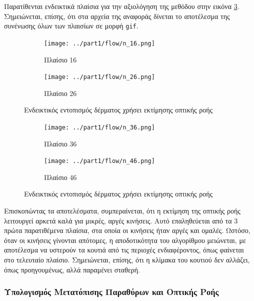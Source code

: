 \documentclass{article}
\newcommand{\eng}[1]{\foreignlanguage{english}{#1}}
\begin{document}
Παρατίθενται ενδεικτικά πλαίσια για την αξιολόγηση της μεθόδου στην εικόνα \ref{fig:tracking1}. Σημειώνεται, επίσης, ότι στα αρχεία της αναφοράς δίνεται το αποτέλεσμα της συνένωσης όλων των πλαισίων σε μορφή \texttt{\eng{gif}}.

\begin{figure}[h]
    \centering
    \begin{subfigure}[b]{0.49\textwidth}
        \centering{}
        \texttt{[image: ../part1/flow/n\_16.png]}
        \caption{Πλαίσιο 16}
        \label{fig:}
    \end{subfigure}
    \hfill
    \begin{subfigure}[b]{0.49\textwidth}  
        \centering 
        \texttt{[image: ../part1/flow/n\_26.png]}
        \caption{Πλαίσιο 26}
        \label{fig:}
    \end{subfigure}
    \caption{Ενδεικτικός εντοπισμός δέρματος χρήσει εκτίμησης οπτικής ροής}
    \label{fig:tracking1}
\end{figure}
\begin{figure}[h]
    \begin{subfigure}[b]{0.49\textwidth}   
        \centering 
        \texttt{[image: ../part1/flow/n\_36.png]}
        \caption{Πλαίσιο 36}
        \label{fig:}
    \end{subfigure}
    \hfill
    \begin{subfigure}[b]{0.49\textwidth}   
        \centering 
        \texttt{[image: ../part1/flow/n\_46.png]}
        \caption{Πλαίσιο 46}
        \label{fig:}
    \end{subfigure}
    \caption{Ενδεικτικός εντοπισμός δέρματος χρήσει εκτίμησης οπτικής ροής}
    \label{fig:tracking2}
\end{figure}
\FloatBarrier

Επισκοπώντας τα αποτελέσματα, συμπεραίνεται, ότι η εκτίμηση της οπτικής ροής λειτουργεί αρκετά καλά για μικρές, αργές κινήσεις. Αυτό επαληθεύεται από τα 3 πρώτα παρατιθέμενα πλαίσια, στα οποία οι κινήσεις ήταν αργές και ομαλές. Ωστόσο, όταν οι κινήσεις γίνονται απότομες, η αποδοτικότητα του αλγορίθμου μειώνεται, με αποτέλεσμα να υστερούν τα κουτιά από τις περιοχές ενδιαφέροντος, όπως φαίνεται στο τελευταίο πλαίσιο. Σημειώνεται, επίσης, ότι η κλίμακα του κουτιού δεν αλλάζει, όπως προηγουμένως, αλλά παραμένει σταθερή.

\clearpage
\subsubsection{Υπολογισμός Μετατόπισης Παραθύρων και Οπτικής Ροής}
\end{document}
